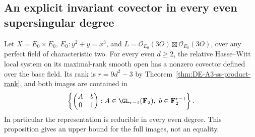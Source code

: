 \subsection{An explicit invariant covector in every even supersingular degree}
\label{subsec:ss-even-covector}

\begin{proposition}\label{prop:ss-even-degree-covector}
Let $X=E_0\times E_0$, $E_0:y^2+y=x^3$, and
$L=\mathcal O_{E_0}(3O)\boxtimes\mathcal O_{E_0}(3O)$, over any perfect
field of characteristic two. For every even $d\ge2$, the relative
Hasse--Witt local system on its maximal-rank smooth open has a nonzero
covector defined over the base field. Its rank is $r=9d^2-3$ by
Theorem~\ref{thm:DE-A3-ss-product-rank}, and both images are contained in
\[
 \left\{\begin{pmatrix}A&b\\0&1\end{pmatrix}:
 A\in\GL_{r-1}(\mathbf F_2),\ b\in\mathbf F_2^{r-1}\right\}.
\]
In particular the representation is reducible in every even degree.
This proposition gives an upper bound for the full images, not an equality.
\end{proposition}

